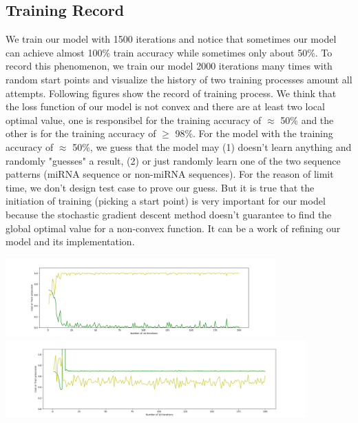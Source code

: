 \documentclass[letterpaper, 11pt]{article}
\newenvironment{Figure}
  {\par\medskip\noindent\minipage{\linewidth}}
  {\endminipage\par\medskip}
\begin{document}
\begin{multicols*}{2}
{\subsection{Training Record}
We train our model with 1500 iterations and notice that sometimes our model can achieve almost 100\% train accuracy while sometimes only about 50\%. To record this phenomenon, we train our model 2000 iterations many times with random start points and visualize the history of two training processes amount all attempts. Following figures show the record of training process. We think that the loss function of our model is not convex and there are at least two local optimal value, one is responsibel for the training accuracy of $\approx$ 50\% and the other is for the training accuracy of $\geq$ 98\%. For the model with the training accuracy of $\approx$ 50\%, we guess that the model may (1) doesn't learn anything and randomly "guesses" a result, (2) or just randomly learn one of the two sequence patterns (miRNA sequence or non-miRNA sequences). For the reason of limit time, we don't design test case to prove our guess. But it is true that the initiation of training (picking a start point) is very important for our model because the stochastic gradient descent method doesn't guarantee to find the global optimal value for a non-convex function. It can be a work of refining our model and its implementation. 
\begin{Figure}
\includegraphics[height = 3cm, width = \textwidth]{correct.png}
\vspace{2mm}
\includegraphics[height = 3cm, width = \textwidth]{incorrect.png}
\end{Figure}


}
\end{multicols*}
\end{document}
